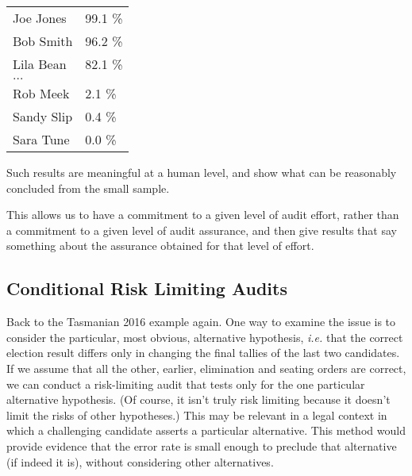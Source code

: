 \documentclass[10pt,a4paper]{article}
\begin{document}
\begin{tabular}{ll}
Joe Jones    & 99.1 \% \\
Bob Smith    & 96.2 \% \\
Lila Bean      & 82.1 \% \\
$\ldots$    & \\
Rob Meek       & 2.1 \% \\ 
Sandy Slip      & 0.4 \%   \\
Sara Tune       & 0.0 \%   \\
\end{tabular}

Such results are meaningful at a human level, and show
what can be reasonably concluded from the small sample.

This allows us to have a commitment to a given
level of audit effort, rather than a commitment to a given level
of audit assurance, and then give results that say something about
the assurance obtained for that level of effort.


\subsection{Conditional Risk Limiting Audits} \label{subsec:conditional}

Back to the Tasmanian 2016 example again. One way to examine the issue is to consider the particular, most obvious, alternative hypothesis, {\it i.e.} that the correct election result differs only in changing the final tallies of the last two candidates.  If we assume that all the other, earlier, elimination and seating orders are correct, we can conduct a risk-limiting audit that tests only for the one particular alternative hypothesis.  (Of course, it isn't truly risk limiting because it doesn't limit the risks of other hypotheses.) This may be relevant in a legal context in which a challenging candidate 
asserts a particular alternative. This method would provide evidence that the error rate is small enough to preclude that alternative (if indeed it is), without considering other alternatives.
\end{document}
